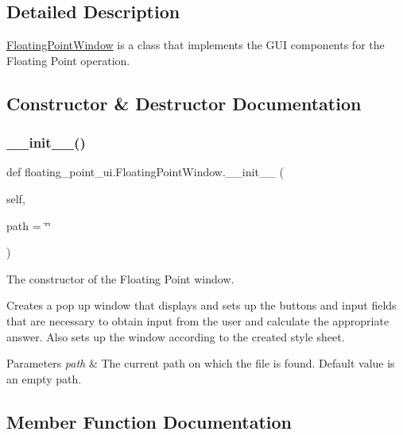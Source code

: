 \subsection{Detailed Description}
\hyperlink{classfloating__point__ui_1_1_floating_point_window}{Floating\+Point\+Window} is a class that implements the G\+UI components for the Floating Point operation. 

\subsection{Constructor \& Destructor Documentation}
\mbox{\label{classfloating__point__ui_1_1_floating_point_window_ab5a1e532591e07c6ad7603c561532979}} 
\subsubsection{\texorpdfstring{\+\_\+\+\_\+init\+\_\+\+\_\+()}{\_\_init\_\_()}}
{\footnotesize\ttfamily def floating\+\_\+point\+\_\+ui.\+Floating\+Point\+Window.\+\_\+\+\_\+init\+\_\+\+\_\+ (\begin{DoxyParamCaption}\item[{}]{self,  }\item[{}]{path = {\ttfamily \char`\"{}\char`\"{}} }\end{DoxyParamCaption})}



The constructor of the Floating Point window. 

Creates a pop up window that displays and sets up the buttons and input fields that are necessary to obtain input from the user and calculate the appropriate answer. Also sets up the window according to the created style sheet. 
\begin{DoxyParams}{Parameters}
{\em path} & The current path on which the file is found. Default value is an empty path. \\
\hline
\end{DoxyParams}


\subsection{Member Function Documentation}
\mbox{\label{classfloating__point__ui_1_1_floating_point_window_a3e36de9fde9b6387740d13a644fdfc56}} 

